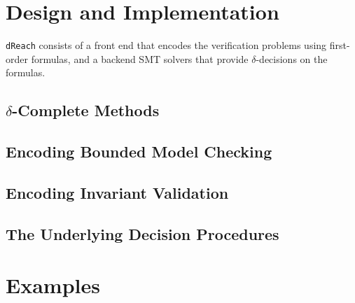 \documentclass[envcountsect]{llncs}
\begin{document}
\newpage
\section{Design and Implementation}

{\tt dReach} consists of a front end that encodes the verification problems
using first-order formulas, and a backend SMT solvers that provide
$\delta$-decisions on the formulas.

\subsection{$\delta$-Complete Methods}

\subsection{Encoding Bounded Model Checking}

\subsection{Encoding Invariant Validation}






\subsection{The Underlying Decision Procedures}


\section{Examples}




\end{document}
